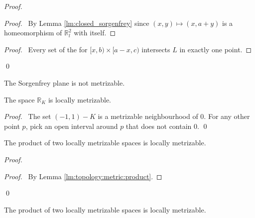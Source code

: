 \begin{proof}
\pf
{}
\step{<1>2}{\pick\ $a > 0$ such that $[0,a)^2 \subseteq U$}
\begin{proof}
  \pf\ By Lemma \ref{lm:closed_sorgenfrey} since $(x,y) \mapsto (x,a+y)$ is
  a homeomorphism of $\mathbb{R}_l^2$ with itself.
\end{proof}
\step{<1>5}{\pflet{$\mathcal{U} = \{ U \setminus L \} \cup \{ ([x,b) \times
    [a-x,c)) \cap U : b > a, c > a - x \}$}}
\begin{proof}
  \pf\ Every set of the for $[x,b) \times [a-x,c)$ intersects $L$ in exactly
one point.
\end{proof}
\qed
\end{proof}

\begin{cor}
The Sorgenfrey plane is not metrizable.
\end{cor}

\begin{prop}
The space $\mathbb{R}_K$ is locally metrizable.
\end{prop}

\begin{proof}
\pf\ The set $(-1, 1) - K$ is a metrizable neighbourhood of 0. For any other
point $p$, pick an open interval around $p$ that does not contain 0. \qed
\end{proof}
\begin{prop}
The product of two locally metrizable spaces is locally metrizable.
\end{prop}

\begin{proof}
\pf
{}
\begin{proof}
  \pf\ By Lemma \ref{lm:topology:metric:product}.
\end{proof}
\qed
\end{proof}


\begin{prop}
The product of two locally metrizable spaces is locally metrizable.
\end{prop}

